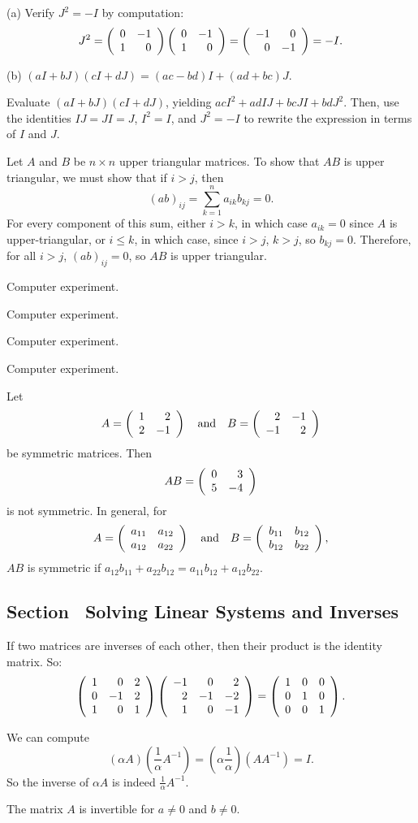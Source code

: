 \documentclass{ximera}
\begin{document}
(a) Verify $J^2 = -I$ by computation:
\[ J^2 = \left(\begin{array}{rr} 0 & -1\\ 1 &0\end{array}\right)\left(\begin{array}{rr} 0 & -1\\ 1 &0\end{array}\right) =
\left(\begin{array}{rr} -1 & 0\\ 0 &-1\end{array}\right) = -I. \]

(b) \ans $(aI + bJ)(cI + dJ) = (ac - bd)I + (ad + bc)J$.

\soln Evaluate $(aI + bJ)(cI + dJ)$, yielding
$acI^2 + adIJ + bcJI + bdJ^2$.  Then, use the identities $IJ = JI = J$,
$I^2 = I$, and $J^2 = -I$ to rewrite the expression in terms of $I$
and $J$.

Let $A$ and $B$ be $n \times n$ upper triangular matrices.  To show
that $AB$ is upper triangular, we must show that if $i > j$, then
\[ (ab)_{ij} = \sum_{k = 1}^{n} a_{ik}b_{kj} = 0. \]
For every component of this sum, either $i > k$, in which case $a_{ik}
= 0$ since $A$ is upper-triangular, or $i \leq k$, in which case, since
$i > j$, $k > j$, so $b_{kj} = 0$.  Therefore, for all $i > j$,
$(ab)_{ij} = 0$, so $AB$ is upper triangular.


 Computer experiment.


 Computer experiment.

 Computer experiment.

 Computer experiment.

 Let
\[ A = \left(\begin{array}{rr} 1 & 2\\ 2 &-1\end{array}\right) \quad\mbox{and}\quad B = \left(\begin{array}{rr} 2 & -1\\ -1 &2\end{array}\right) \]
be symmetric matrices.  Then
\[ AB = \left(\begin{array}{rr} 0 & 3\\ 5 &-4\end{array}\right) \]
is not symmetric.  In general, for
\[ A = \left(\begin{array}{rr} a_{11} & a_{12}\\ a_{12} &a_{22}\end{array}\right) \quad\mbox{and}\quad
B = \left(\begin{array}{rr} b_{11} & b_{12}\\ b_{12} &b_{22}\end{array}\right), \]
$AB$ is symmetric if $a_{12}b_{11} + a_{22}b_{12} = a_{11}b_{12}
+ a_{12}b_{22}$.


\subsection*{Section~\protect{\ref{S:SLS}} Solving Linear Systems and Inverses}

If two matrices are inverses of each other, then their product is the
identity matrix.  So:
\[ \left(\begin{array}{rrr} 1 & 0 & 2 \\ 0 & -1 & 2 \\ 1 & 0 & 1\end{array}\right)
\left(\begin{array}{rrr} -1 & 0 & 2 \\ 2 & -1 & -2 \\ 1 & 0 & -1\end{array}\right) =
\left(\begin{array}{rrr} 1 & 0 & 0 \\ 0 & 1 & 0 \\ 0 & 0 & 1\end{array}\right). \]

We can compute
\[ (\alpha A)\left(\frac{1}{\alpha}A^{-1}\right) =
\left(\alpha\frac{1}{\alpha}\right)(AA^{-1}) = I. \]
So the inverse of $\alpha A$ is indeed $\frac{1}{\alpha}A^{-1}$.

\ans The matrix $A$ is invertible for $a \neq 0$ and $b \neq 0$.
\end{document}
